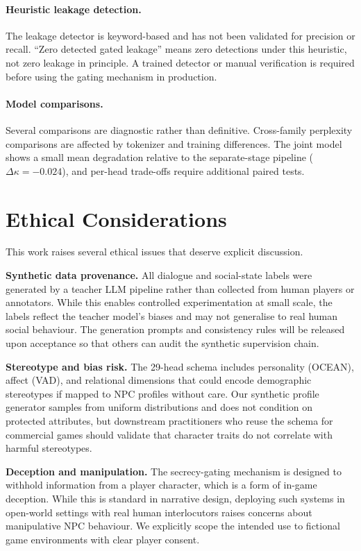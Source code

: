 \documentclass[11pt]{article}
\begin{document}
\paragraph{Heuristic leakage detection.}
The leakage detector is keyword-based and has not been validated for precision or recall.
``Zero detected gated leakage'' means zero detections under this heuristic, not zero leakage in principle.
A trained detector or manual verification is required before using the gating mechanism in production.

\paragraph{Model comparisons.}
Several comparisons are diagnostic rather than definitive.
Cross-family perplexity comparisons are affected by tokenizer and training differences.
The joint model shows a small mean degradation relative to the separate-stage pipeline ($\Delta\kappa{=}-0.024$), and per-head trade-offs require additional paired tests.

\section*{Ethical Considerations}

This work raises several ethical issues that deserve explicit discussion.

\textbf{Synthetic data provenance.} All dialogue and social-state labels were generated by a teacher LLM pipeline rather than collected from human players or annotators.
While this enables controlled experimentation at small scale, the labels reflect the teacher model's biases and may not generalise to real human social behaviour.
The generation prompts and consistency rules will be released upon acceptance so that others can audit the synthetic supervision chain.

\textbf{Stereotype and bias risk.} The 29-head schema includes personality (OCEAN), affect (VAD), and relational dimensions that could encode demographic stereotypes if mapped to NPC profiles without care.
Our synthetic profile generator samples from uniform distributions and does not condition on protected attributes, but downstream practitioners who reuse the schema for commercial games should validate that character traits do not correlate with harmful stereotypes.

\textbf{Deception and manipulation.} The secrecy-gating mechanism is designed to withhold information from a player character, which is a form of in-game deception.
While this is standard in narrative design, deploying such systems in open-world settings with real human interlocutors raises concerns about manipulative NPC behaviour.
We explicitly scope the intended use to fictional game environments with clear player consent.
\end{document}
